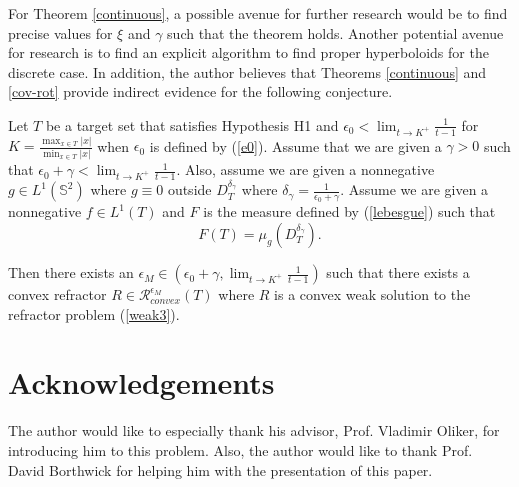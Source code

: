 \documentclass[review]{elsarticle}
\begin{document}
For Theorem \ref{continuous}, a possible avenue for further research would be to find precise values for $\xi$ and $\gamma$ such that the theorem holds. Another potential avenue for research is to find an explicit algorithm to find proper hyperboloids for the discrete case. In addition, the author believes that Theorems \ref{continuous} and \ref{cov-rot} provide indirect evidence for the following conjecture. 

\begin{conj}
Let $T$ be a target set that satisfies Hypothesis H1 and $\epsilon_0<\lim_{t\to K^+}\frac{1}{t-1}$ for $K=\frac{\max_{x\in T} |x|}{\min_{x\in T} |x|}$ when $\epsilon_0$ is defined by (\ref{e0}).  Assume that we are given a $\gamma>0$ such that $\epsilon_0+\gamma<\lim_{t\to K^+}\frac{1}{t-1}$. Also, assume we are given a nonnegative $g\in L^1(\mathbb{S}^2)$ where $g\equiv 0$ outside $D_T^{\delta_\gamma}$ where $\delta_\gamma=\frac{1}{\epsilon_0 +\gamma}$. Assume we are given a nonnegative $f\in L^1(T)$ and $F$ is the measure defined by (\ref{lebesgue}) such that
\begin{equation}
    F(T) = \mu_{g}(D_T^{\delta_\gamma}).
\end{equation}

Then there exists an $\epsilon_M\in(\epsilon_0+\gamma,\lim_{t\to K^+}\frac{1}{t-1})$ such that there exists a convex refractor $R  \in \mathcal{R}_{convex}^{\epsilon_M} (T)$ where $R$ is a convex weak solution to the refractor problem (\ref{weak3}).
\end{conj}


\section*{Acknowledgements}

The author would like to especially thank his advisor, Prof. Vladimir Oliker, for introducing him to this problem. Also, the author would like to thank Prof. David Borthwick for helping him with the presentation of this paper. 



\end{document}
